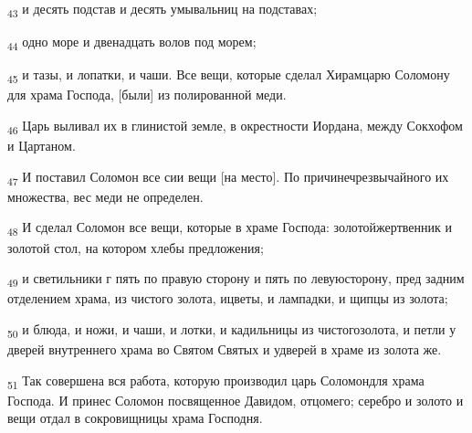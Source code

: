 \begin{tcolorbox}
\textsubscript{43} и десять подстав и десять умывальниц на подставах;
\end{tcolorbox}
\begin{tcolorbox}
\textsubscript{44} одно море и двенадцать волов под морем;
\end{tcolorbox}
\begin{tcolorbox}
\textsubscript{45} и тазы, и лопатки, и чаши. Все вещи, которые сделал Хирамцарю Соломону для храма Господа, [были] из полированной меди.
\end{tcolorbox}
\begin{tcolorbox}
\textsubscript{46} Царь выливал их в глинистой земле, в окрестности Иордана, между Сокхофом и Цартаном.
\end{tcolorbox}
\begin{tcolorbox}
\textsubscript{47} И поставил Соломон все сии вещи [на место]. По причинечрезвычайного их множества, вес меди не определен.
\end{tcolorbox}
\begin{tcolorbox}
\textsubscript{48} И сделал Соломон все вещи, которые в храме Господа: золотойжертвенник и золотой стол, на котором хлебы предложения;
\end{tcolorbox}
\begin{tcolorbox}
\textsubscript{49} и светильники г пять по правую сторону и пять по левуюсторону, пред задним отделением храма, из чистого золота, ицветы, и лампадки, и щипцы из золота;
\end{tcolorbox}
\begin{tcolorbox}
\textsubscript{50} и блюда, и ножи, и чаши, и лотки, и кадильницы из чистогозолота, и петли у дверей внутреннего храма во Святом Святых и удверей в храме из золота же.
\end{tcolorbox}
\begin{tcolorbox}
\textsubscript{51} Так совершена вся работа, которую производил царь Соломондля храма Господа. И принес Соломон посвященное Давидом, отцомего; серебро и золото и вещи отдал в сокровищницы храма Господня.
\end{tcolorbox}
